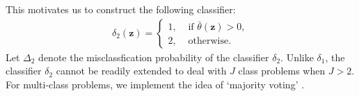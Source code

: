 \documentclass[twoside]{article}
\newcommand{\bZ}{\mathbf{Z}}
\newcommand{\bF}{\mathbf{F}}
\newcommand{\bz}{\mathbf{z}}
\newcommand{\0}{\mathbf{0}}
\newcommand{\1}{\mathbf{1}}
\numberwithin{equation}{section}
\begin{document}

This motivates us to construct the following classifier:
\vspace{-0.1cm}
\begin{align}\label{del2def}
 \delta_2(\bz)=\begin{cases}
                1,& \text{ if }\bar{\theta}(\bz)>0,\\
                2,& \text{ otherwise.}
               \end{cases}
\end{align}
Let $\Delta_2$ denote the misclassfication probability of the classifier $\delta_2.$ Unlike $\delta_1$, the classifier $\delta_2$ cannot be readily extended to deal with $J$ class problems when $J>2$. For multi-class problems, we implement the idea of `majority voting' \citep{friedman2001elements}.%
\end{document}
